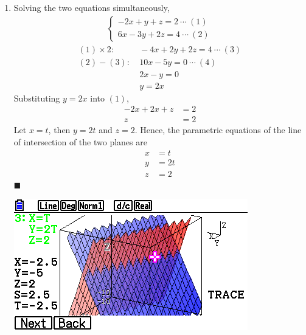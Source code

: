 \begin{enumerate}
\begin{enumerate}
              \item Solving the two equations simultaneously,
                    \begin{align*}
                        \begin{cases}
                            -2x + y + z  = 2\ \cdots\ (1) \\
                            6x - 3y + 2z = 4\ \cdots\ (2)
                        \end{cases}
                    \end{align*}
                    \begin{align*}
                        (1) \times 2: & \ -4x + 2y + 2z = 4\ \cdots\ (3) \\
                        (2) - (3):    & \ 10x - 5y = 0\ \cdots\ (4)      \\
                                      & \ 2x - y = 0                     \\
                                      & \ y = 2x
                    \end{align*}
                    Substituting $y = 2x$ into $(1)$,
                    \begin{align*}
                        -2x + 2x + z & = 2 \\
                        z            & = 2
                    \end{align*}
                    Let $x = t$, then $y = 2t$ and $z = 2$. Hence, the parametric equations of the line of intersection of the two planes are
                    \begin{align*}
                        x & = t  \\
                        y & = 2t \\
                        z & = 2
                    \end{align*} \hfill $\blacksquare$
                    \begin{center}
                        \includegraphics[scale=0.5]{assets/larson11.5q66graph.png}
                    \end{center}
          \end{enumerate}
\end{enumerate}